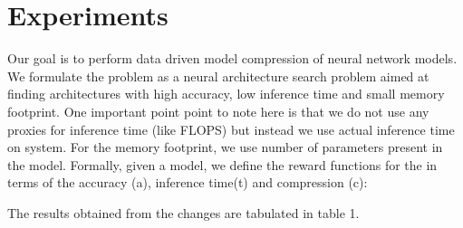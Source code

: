\documentclass[../main]{subfiles}
\begin{document}
\section{Experiments}
Our goal is to perform data driven model compression of neural network models. We formulate the problem as a neural architecture search problem aimed at finding architectures with high accuracy, low inference time and small memory footprint. One important point point to note here is that we do not use any proxies for inference time (like FLOPS) but instead we use actual inference time on system. For the memory footprint, we use number of parameters present in the model.
Formally, given a model, we define the reward functions for the in terms of the accuracy (a), inference time(t) and compression (c): 





The results obtained from the changes are tabulated in table 1.
 
 
\end{document}

